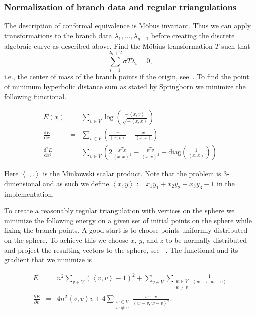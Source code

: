 \documentclass[Thesis]{subfiles}
\begin{document}
\subsubsection{Normalization of branch data and regular triangulations}
The description of conformal equivalence is M{\"o}bus invariant. Thus we can apply transformations to the branch data $\lambda_1,\ldots,\lambda_{g+1}$ before creating the discrete algebraic curve as described above. Find the M{\"o}bius transformation $T$ such that
\[\sum_{i=1}^{2g+2}\sigma T \lambda_i = 0,\]
i.e., the center of mass of the branch points if the origin, see~\cite{Springborn05}.
To find the point of minimum hyperbolic distance sum as stated by Springborn we minimize the following functional. 

\begin{eqnarray*} 
	E(x) &=& \sum_{v\in V}\log\left(\frac{-\left<x,v\right>}{\sqrt{-\left<x,x\right>}}\right)\\
	\frac{\mathrm d E}{\mathrm dx} &=& \sum_{v\in V}\left(\frac{v}{\left<x,v\right>} - \frac{x}{\left<x,x\right>}\right)\\
	\frac{\mathrm d^2 E}{\mathrm dx^2} &=& \sum_{v\in V}\left(2\frac{x^Tx}{\left<x,x\right>^2}-\frac{v^Tv}{\left<x,v\right>^2} - \mathrm{diag}\left(\frac{1}{\left<x,x\right>}\right)\right)
\end{eqnarray*}

Here $\left<.,.\right>$ is the Minkowski scalar product. Note that the problem is
 $3$-dimensional and as such we define $\left<x,y\right>:=x_1y_1+x_2y_2+x_3y_3-1$ in
the implementation.

To create a reasonably regular triangulation with vertices on the sphere we minimize the following energy on a given set of initial points on the sphere while fixing the branch points. 
A good start is to choose points uniformly distributed on the sphere. 
To achieve this we choose $x$, $y$, and $z$ to be normally distributed and project the resulting vectors to the sphere, see~ \cite{Muller1959}. 
The functional and its gradient that we minimize is

\begin{eqnarray*}
	E &=& n^2\sum_{v\in V}\left( \left<v,v\right> - 1\right)^2 + \sum_{v\in
V}\sum_{\substack{w\in V\\w\neq v}} \frac{1}{\left<w-v, w-v\right>}\\ \frac{\partial
E}{\partial v} &=& 4n^2\left<v,v\right>v + 4\sum_{\substack{w\in V\\w\neq
v}}\frac{w-v}{\left<w-v,w-v\right>^2}.  \end{eqnarray*}
\end{document}
